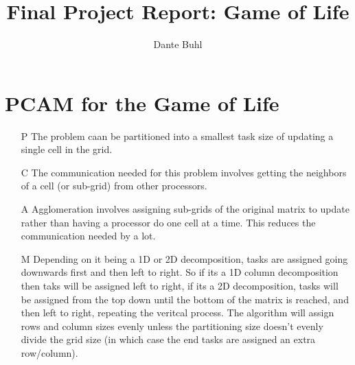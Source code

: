 \documentclass{article}
\title{Final Project Report: Game of Life}
\author{Dante Buhl}
\begin{document}
\newcommand{\bs}[1]{\boldsymbol{#1}}
\newcommand{\bmp}[1]{\begin{minipage}{#1\textwidth}}
\newcommand{\emp}{\end{minipage}}
\newcommand{\R}{\mathbb{R}}
\newcommand{\C}{\mathbb{C}}
\newcommand{\N}{\mathcal{N}}
\newcommand{\I}{\mathrm{I}}
\newcommand{\K}{\bs{\mathrm{K}}}
\newcommand{\m}{\bs{\mu}_*}
\newcommand{\s}{\bs{\Sigma}_*}
\newcommand{\dt}{\Delta t}
\newcommand{\dr}{\Delta r}
\newcommand{\dx}{\Delta x}
\newcommand{\tr}[1]{\text{Tr}(#1)}
\newcommand{\Tr}[1]{\text{Tr}(#1)}
\newcommand{\pd}[2]{\frac{\partial #1}{\partial #2}}


\maketitle

\section*{PCAM for the Game of Life}

\begin{enumerate}[label=\alph*)]

\item[P] The problem caan be partitioned into a smallest task size of updating a
single cell in the grid. 

\item[C] The communication needed for this problem involves getting the
neighbors of a cell (or sub-grid) from other processors.

\item[A] Agglomeration involves assigning sub-grids of the original matrix to
update rather than having a processor do one cell at a time. This reduces the
communication needed by a lot. 

\item[M] Depending on it being a 1D or 2D decomposition, tasks are assigned
going downwards first and then left to right. So if its a 1D column
decomposition then taks will be assigned left to right, if its a 2D
decomposition, tasks will be assigned from the top down until the bottom of the
matrix is reached, and then left to right, repeating the veritcal process. The
algorithm will assign rows and column sizes evenly unless the partitioning size
doesn't evenly divide the grid size (in which case the end tasks are assigned an
extra row/column). 

\end{enumerate}
\end{document}

